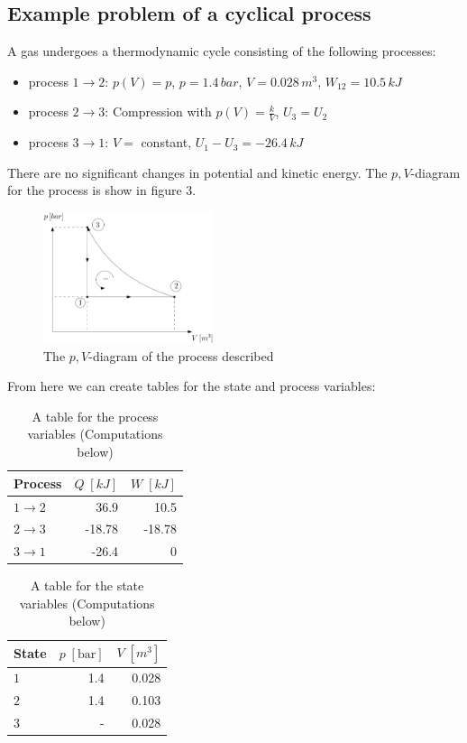 \documentclass[11pt, a4paper]{article}
\begin{document}
\subsection{Example problem of a cyclical process}
A gas undergoes a thermodynamic cycle consisting of the following processes:
\begin{itemize}
  \item process $1 \to 2$: $p(V) = p$, $p = 1.4\,bar$, $V=0.028\,m^3$, $W_{12}=10.5\,kJ$
  \item process $2 \to 3$: Compression with $p(V) = \frac{k}{V}$, $U_3 = U_2$
  \item process $3 \to 1$: $V = $ constant, $U_1 - U_3 = -26.4\, kJ$
\end{itemize}
There are no significant changes in potential and kinetic energy. The $p,V$-diagram for the process is show in figure 3.
\begin{figure}[h]
  \centerline{\includegraphics[width=50mm]{images/Example_process_cycle.png}}
  \caption{The $p,V$-diagram of the process described}
\end{figure}
From here we can create tables for the state and process variables:
\begin{table}[h!]
  \begin{center}
    \caption{A table for the process variables (Computations below)}
    \label{tab:table1}
    \begin{tabular}{l|r|r}
      \textbf{Process} & $Q\;[kJ]$ & $W\;[kJ]$\\
      \hline
      $1 \to 2$& 36.9 & 10.5\\
      
      $2 \to 3$& -18.78 & -18.78\\

      $3 \to 1$& -26.4 & 0\\
    \end{tabular}
  \end{center}
\end{table}
\begin{table}[h!]
  \begin{center}
    \caption{A table for the state variables (Computations below)}
    \label{tab:table1}
    \begin{tabular}{l|r|r}
      \textbf{State} & $p\;[\text{bar}]$ & $V\;[m^3]$\\
      \hline
      $1$ & 1.4 & 0.028\\
      
      $2$ & 1.4 & 0.103\\

      $3$ & - & 0.028\\
    \end{tabular}
  \end{center}
\end{table}
\end{document}
